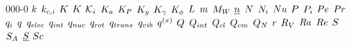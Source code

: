 \begin{mitframe}{000-0}
$\thermcond$ \newline
$\masstranscoeff$ \newline
$\dilfac$ \newline
$\taylordisp$ \newline
$\partcoeff$ \newline
$\eqconst$ \newline
$\peqconst$ \newline
$\yeqconst$ \newline
$\acteqconst$ \newline
$\fugeqconst$ \newline
$\length$ \newline
$\mass$ \newline
$\mw$ \newline
$\normvec$ \newline
$\nummoles$ \newline
$\massspecflux{i}$ \newline
$\nusselt$ \newline
$\p$ \newline
$\prob{i}$ \newline
$\peclet$ \newline
$\prandtl$ \newline
$\charge{i}$ \newline
$\heatflux$ \newline
$\empc$ \newline
$\impc$ \newline
$\nmpc$ \newline
$\rmpc$ \newline
$\tmpc$ \newline
$\vmpc$ \newline
$\dufour$ \newline
$\heatflow$ \newline
$\ipc$ \newline
$\cpc$ \newline
$\cmpc$ \newline
$\cpf$ \newline
$\pos$ \newline
$\specsource$ \newline
$\rayleigh$ \newline
$\reynolds$ \newline
$\entropy$ \newline
$\sa$ \newline
$\stressvec$ \newline
$\schmidt$ \newline

\end{mitframe}
